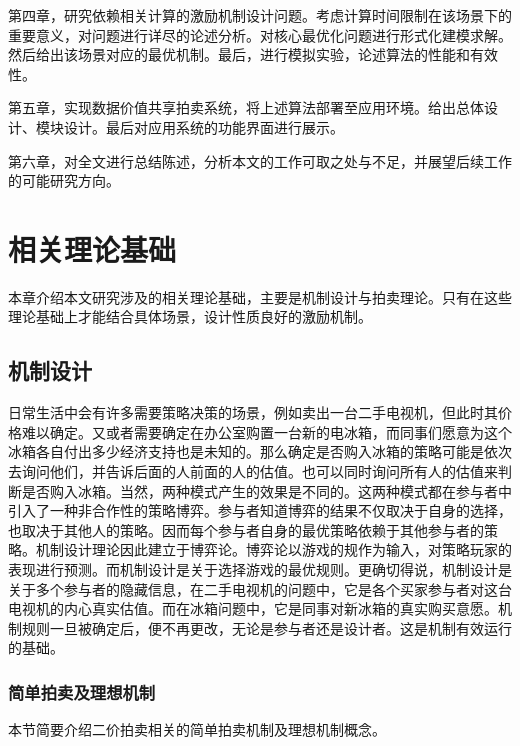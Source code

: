 \documentclass[promaster]{thesis-uestc}
\begin{document}
第四章，研究依赖相关计算的激励机制设计问题。考虑计算时间限制在该场景下的重要意义，对问题进行详尽的论述分析。对核心最优化问题进行形式化建模求解。然后给出该场景对应的最优机制。最后，进行模拟实验，论述算法的性能和有效性。

第五章，实现数据价值共享拍卖系统，将上述算法部署至应用环境。给出总体设计、模块设计。最后对应用系统的功能界面进行展示。

第六章，对全文进行总结陈述，分析本文的工作可取之处与不足，并展望后续工作的可能研究方向。



\chapter{相关理论基础}

本章介绍本文研究涉及的相关理论基础，主要是机制设计与拍卖理论。只有在这些理论基础上才能结合具体场景，设计性质良好的激励机制。

\section{机制设计}

日常生活中会有许多需要策略决策的场景，例如卖出一台二手电视机，但此时其价格难以确定。又或者需要确定在办公室购置一台新的电冰箱，而同事们愿意为这个冰箱各自付出多少经济支持也是未知的。那么确定是否购入冰箱的策略可能是依次去询问他们，并告诉后面的人前面的人的估值。也可以同时询问所有人的估值来判断是否购入冰箱。当然，两种模式产生的效果是不同的。这两种模式都在参与者中引入了一种非合作性的策略博弈。参与者知道博弈的结果不仅取决于自身的选择，也取决于其他人的策略。因而每个参与者自身的最优策略依赖于其他参与者的策略。机制设计理论因此建立于博弈论。博弈论以游戏的规作为输入，对策略玩家的表现进行预测。而机制设计是关于选择游戏的最优规则。更确切得说，机制设计是关于多个参与者的隐藏信息，在二手电视机的问题中，它是各个买家参与者对这台电视机的内心真实估值。而在冰箱问题中，它是同事对新冰箱的真实购买意愿。机制规则一旦被确定后，便不再更改，无论是参与者还是设计者。这是机制有效运行的基础。

\subsection{简单拍卖及理想机制}
本节简要介绍二价拍卖相关的简单拍卖机制及理想机制概念。
\end{document}
